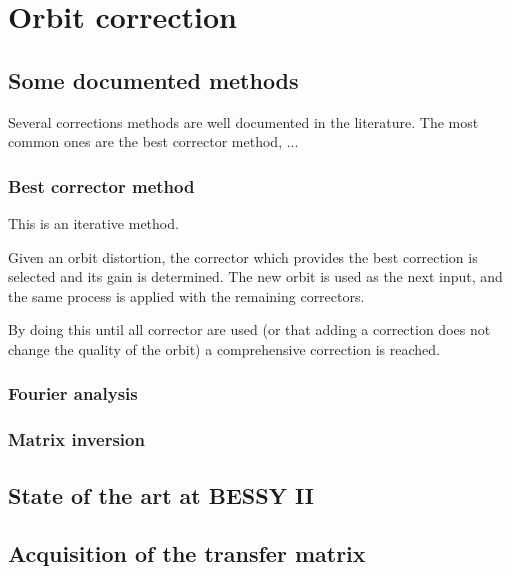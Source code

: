 
\chapter{Orbit correction}
\label{sec:correction}
\section{Some documented methods}

Several corrections methods are well documented in the literature. The most common ones are the best corrector method, ...

\subsection{Best corrector method}
This is an iterative method.

Given an orbit distortion, the corrector which provides the best correction is selected and its gain is determined. The new orbit is used as the next input, and the same process is applied with the remaining correctors. 

By doing this until all corrector are used (or that adding a correction does not change the quality of the orbit) a comprehensive correction is reached.

\subsection{Fourier analysis}

\subsection{Matrix inversion}

\section{State of the art at BESSY II}
\section{Acquisition of the transfer matrix}

